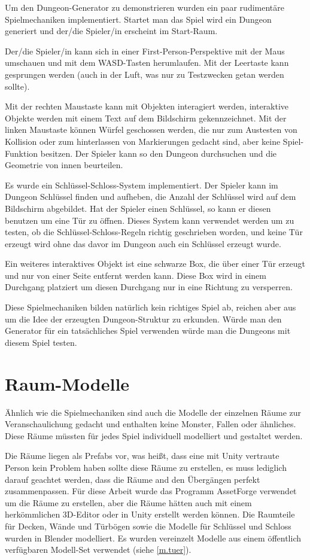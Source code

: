 Um den Dungeon-Generator zu demonstrieren wurden ein paar rudimentäre Spielmechaniken implementiert. Startet man das Spiel wird ein Dungeon generiert und der/die Spieler/in erscheint im Start-Raum.

Der/die Spieler/in kann sich in einer First-Person-Perspektive mit der Maus umschauen und mit dem WASD-Tasten herumlaufen. Mit der Leertaste kann gesprungen werden (auch in der Luft, was nur zu Testzwecken getan werden sollte).

Mit der rechten Maustaste kann mit Objekten interagiert werden, interaktive Objekte werden mit einem Text auf dem Bildschirm gekennzeichnet. Mit der linken Maustaste können Würfel geschossen werden, die nur zum Austesten von Kollision oder zum hinterlassen von Markierungen gedacht sind, aber keine Spiel-Funktion besitzen. Der Spieler kann so den Dungeon durchsuchen und die Geometrie von innen beurteilen. 

Es wurde ein Schlüssel-Schloss-System implementiert. Der Spieler kann im Dungeon Schlüssel finden und aufheben, die Anzahl der Schlüssel wird auf dem Bildschirm abgebildet. Hat der Spieler einen Schlüssel, so kann er diesen benutzen um eine Tür zu öffnen. Dieses System kann verwendet werden um zu testen, ob die Schlüssel-Schloss-Regeln richtig geschrieben worden, und keine Tür erzeugt wird ohne das davor im Dungeon auch ein Schlüssel erzeugt wurde.

Ein weiteres interaktives Objekt ist eine schwarze Box, die über einer Tür erzeugt und nur von einer Seite entfernt werden kann. Diese Box wird in einem Durchgang platziert um diesen Durchgang nur in eine Richtung zu versperren.

Diese Spielmechaniken bilden natürlich kein richtiges Spiel ab, reichen aber aus um die Idee der erzeugten Dungeon-Struktur zu erkunden. Würde man den Generator für ein tatsächliches Spiel verwenden würde man die Dungeons mit diesem Spiel testen.

\section{Raum-Modelle}

Ähnlich wie die Spielmechaniken sind auch die Modelle der einzelnen Räume zur Veranschaulichung gedacht und enthalten keine Monster, Fallen oder ähnliches. Diese Räume müssten für jedes Spiel individuell modelliert und gestaltet werden. 

Die Räume liegen als Prefabs vor, was heißt, dass eine mit Unity vertraute Person kein Problem haben sollte diese Räume zu erstellen, es muss lediglich darauf geachtet werden, dass die Räume and den Übergängen perfekt zusammenpassen. Für diese Arbeit wurde das Programm AssetForge verwendet um die Räume zu erstellen, aber die Räume hätten auch mit einem herkömmlichen 3D-Editor oder in Unity erstellt werden können. Die Raumteile für Decken, Wände und Türbögen sowie die Modelle für Schlüssel und Schloss wurden in Blender modelliert. Es wurden vereinzelt Modelle aus einem öffentlich verfügbaren Modell-Set verwendet (siehe \ref{m.tuer}).

